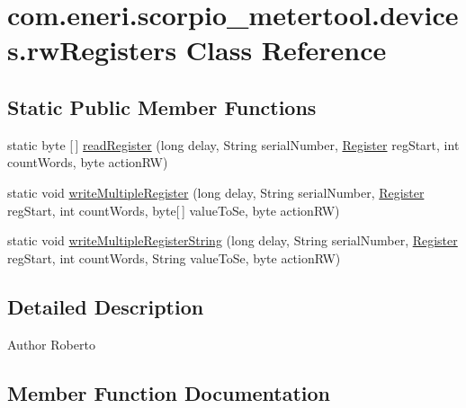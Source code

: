 \hypertarget{classcom_1_1eneri_1_1scorpio__metertool_1_1devices_1_1rw_registers}{}\section{com.\+eneri.\+scorpio\+\_\+metertool.\+devices.\+rw\+Registers Class Reference}
\label{classcom_1_1eneri_1_1scorpio__metertool_1_1devices_1_1rw_registers}
\subsection*{Static Public Member Functions}
\begin{DoxyCompactItemize}
\item 
static byte \mbox{[}$\,$\mbox{]} \hyperlink{classcom_1_1eneri_1_1scorpio__metertool_1_1devices_1_1rw_registers_a3d6b53c3843e771b44c7f85a9a0a0cc6}{read\+Register} (long delay, String serial\+Number, \hyperlink{enumcom_1_1eneri_1_1scorpio__metertool_1_1devices_1_1_register}{Register} reg\+Start, int count\+Words, byte action\+RW)
\item 
static void \hyperlink{classcom_1_1eneri_1_1scorpio__metertool_1_1devices_1_1rw_registers_a0e767199ee64a5b279df608b2e12caf6}{write\+Multiple\+Register} (long delay, String serial\+Number, \hyperlink{enumcom_1_1eneri_1_1scorpio__metertool_1_1devices_1_1_register}{Register} reg\+Start, int count\+Words, byte\mbox{[}$\,$\mbox{]} value\+To\+Se, byte action\+RW)
\item 
static void \hyperlink{classcom_1_1eneri_1_1scorpio__metertool_1_1devices_1_1rw_registers_a8fefbd4f57ff57078b49ef2ea7592e9d}{write\+Multiple\+Register\+String} (long delay, String serial\+Number, \hyperlink{enumcom_1_1eneri_1_1scorpio__metertool_1_1devices_1_1_register}{Register} reg\+Start, int count\+Words, String value\+To\+Se, byte action\+RW)
\end{DoxyCompactItemize}


\subsection{Detailed Description}
\begin{DoxyAuthor}{Author}
Roberto 
\end{DoxyAuthor}


\subsection{Member Function Documentation}
\mbox{\label{classcom_1_1eneri_1_1scorpio__metertool_1_1devices_1_1rw_registers_a3d6b53c3843e771b44c7f85a9a0a0cc6}} 
